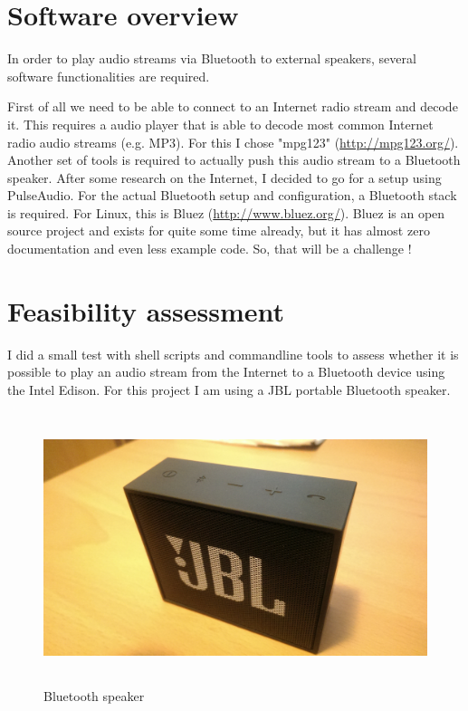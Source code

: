 \documentclass[12pt,a4paper]{scrreprt}
\begin{document}
\section{Software overview}
In order to play audio streams via Bluetooth to external speakers, several software functionalities are required.

First of all we need to be able to connect to an Internet radio stream and decode it. This requires a audio player that is able to decode  most common Internet radio audio streams (e.g. MP3). For this I chose "mpg123" (\url{http://mpg123.org/}). Another set of tools is required to actually push this audio stream to a Bluetooth speaker. 
After some research on the Internet, I decided to go for a setup using PulseAudio.
For the actual Bluetooth setup and configuration, a Bluetooth stack is required. For Linux, this is Bluez (\url{http://www.bluez.org/}). 
Bluez is an open source project and exists for quite some time already, but it has almost zero documentation and even less example code. So, that will be a challenge !

\section{Feasibility assessment}

I did a small test with shell scripts and commandline tools to assess whether it is possible to play an audio stream from the Internet to a Bluetooth device using the  Intel Edison.
For this project I am using a JBL portable Bluetooth speaker.

\begin{figure}[h]
	\includegraphics[height=300px]{images/speaker}
	\caption{Bluetooth speaker}
\end{figure}
\end{document}
